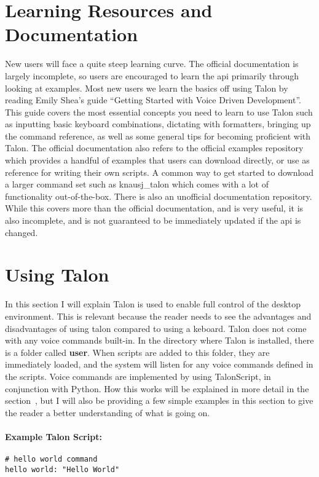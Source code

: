 \documentclass[../thesis.tex]{subfiles}
\begin{document}
\section{Learning Resources and Documentation}
New users will face a quite steep learning curve.
The official documentation is largely incomplete, so users are encouraged to learn the api primarily through looking at examples.
Most new users we learn the basics off using Talon by reading Emily Shea's guide ``Getting Started with Voice Driven Development''.
This guide covers the most essential concepts you need to learn to use Talon such as inputting basic keyboard combinations, dictating with formatters, bringing up the command reference, as well as some general tips for becoming proficient with Talon.
The official documentation also refers to the official examples repository which provides a handful of examples that users can download directly, or use as reference for writing their own scripts.
A common way to get started to download a larger command set such as knausj\_talon which comes with a lot of functionality out-of-the-box.
There is also an unofficial documentation repository.
While this covers more than the official documentation, and is very useful, it is also incomplete, and is not guaranteed to be immediately updated if the api is changed.

\section{Using Talon}
In this section I will explain Talon is used to enable full control of the desktop environment.
This is relevant because the reader needs to see the advantages and disadvantages of using talon compared to using a keboard.
Talon does not come with any voice commands built-in.
In the directory where Talon is installed, there is a folder called \textbf{user}.
When scripts are added to this folder, they are immediately loaded, and the system will listen for any voice commands defined in the scripts.
Voice commands are implemented by using TalonScript, in conjunction with Python.
How this works will be explained in more detail in the section~, but I will also be providing
a few simple examples in this section to give the reader a better understanding of what is going on.

\paragraph{Example Talon Script:}
\begin{verbatim}
# hello world command
hello world: "Hello World"
\end{verbatim}
\end{document}
